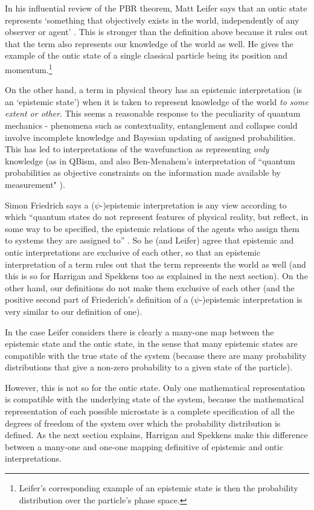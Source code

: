 \documentclass[superscriptaddress, floatfix,nofootinbib,12pt]{revtex4-2}
\begin{document}
In his influential review of the PBR theorem, Matt Leifer says that an ontic state represents `something that objectively exists in the world, independently of any observer or agent' \cite{Leifer2014Review}. This is stronger than the definition above because it rules out that the term also represents our knowledge of the world as well. He gives the example of the ontic state of a single classical particle being its position and momentum.\footnote{Leifer's corresponding example of an epistemic state is then the probability distribution over the particle's phase space.}

On the other hand, a term in physical theory has an epistemic interpretation (is an `epistemic state') when it is taken to represent knowledge of the world \emph{to some extent or other}. This seems a reasonable response to the peculiarity of quantum mechanics - phenomena such as contextuality, entanglement and collapse could involve incomplete knowledge and Bayesian updating of assigned probabilities. This has led to interpretations of the wavefunction as representing \emph{only} knowledge (as in QBism, and also Ben-Menahem's interpretation of ``quantum probabilities as objective constraints on the information made available by measurement" \cite{Benmenahem2017PBR}).

Simon Friedrich says a ($\psi$-)epistemic interpretation is any view according to which ``quantum states do not represent features of physical reality, but reflect, in some way to be specified, the epistemic relations of the agents who assign them to systems they are assigned to'' \cite{friederich2014Interpreting}. So he (and Leifer) agree that epistemic and ontic interpretations are exclusive of each other, so that an epistemic interpretation of a term rules out that the term represents the world as well (and this is so for Harrigan and Spekkens too as explained in the next section). On the other hand, our definitions do not make them exclusive of each other (and the positive second part of Friederich's definition of a ($\psi$-)epistemic interpretation is very similar to our definition of one).

In the case Leifer considers there is clearly a many-one map between the epistemic state and the ontic state, in the sense that many epistemic states are compatible with the true state of the system (because there are many probability distributions that give a non-zero probability to a given state of the particle). 

However, this is not so for the ontic state. Only one mathematical representation is compatible with the underlying state of the system, because the mathematical representation of each possible microstate is a complete specification of all the degrees of freedom of the system over which the probability distribution is defined. As the next section explains, Harrigan and Spekkens make this difference between a many-one and one-one mapping definitive of epistemic and ontic interpretations.
\end{document}
